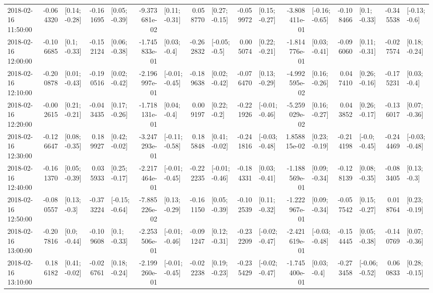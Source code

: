 \begin{tabular}{lrlrlrlrlrlrlrlrl}
2018-02-16 11:50:00 & -0.064320 &   [0.14; -0.28] & -0.161695 &   [0.05; -0.39] & -9.373681e-02 &   [0.11; -0.31] &  0.058770 &   [0.27; -0.15] & -0.059972 &   [0.15; -0.27] & -3.808411e-01 &  [-0.16; -0.65] & -0.108466 &    [0.1; -0.33] & -0.345538 &   [-0.13; -0.6] \\
2018-02-16 12:00:00 & -0.106685 &    [0.1; -0.33] & -0.152124 &   [0.06; -0.38] & -1.745833e-01 &    [0.03; -0.4] & -0.262832 &   [-0.05; -0.5] &  0.005074 &   [0.22; -0.21] & -1.814776e-01 &   [0.03; -0.41] & -0.096060 &   [0.11; -0.31] & -0.027574 &   [0.18; -0.24] \\
2018-02-16 12:10:00 & -0.200878 &   [0.01; -0.43] & -0.190516 &   [0.02; -0.42] & -2.196997e-01 &  [-0.01; -0.45] & -0.189638 &   [0.02; -0.42] & -0.076470 &   [0.13; -0.29] & -4.992595e-02 &   [0.16; -0.26] &  0.047410 &   [0.26; -0.16] & -0.175231 &    [0.03; -0.4] \\
2018-02-16 12:20:00 & -0.002615 &   [0.21; -0.21] & -0.043435 &   [0.17; -0.26] & -1.718131e-01 &    [0.04; -0.4] &  0.009197 &    [0.22; -0.2] & -0.221926 &  [-0.01; -0.46] & -5.259029e-02 &   [0.16; -0.27] &  0.043852 &   [0.26; -0.17] & -0.136017 &   [0.07; -0.36] \\
2018-02-16 12:30:00 & -0.126647 &   [0.08; -0.35] &  0.189927 &   [0.42; -0.02] & -3.247293e-01 &  [-0.11; -0.58] &  0.185848 &   [0.41; -0.02] & -0.241816 &  [-0.03; -0.48] &  1.858815e-02 &   [0.23; -0.19] & -0.214198 &   [-0.0; -0.45] & -0.244469 &  [-0.03; -0.48] \\
2018-02-16 12:40:00 & -0.161370 &   [0.05; -0.39] &  0.035933 &   [0.25; -0.17] & -2.217464e-01 &  [-0.01; -0.45] & -0.222235 &  [-0.01; -0.46] & -0.184331 &   [0.03; -0.41] & -1.188569e-01 &   [0.09; -0.34] & -0.128139 &   [0.08; -0.35] & -0.083405 &    [0.13; -0.3] \\
2018-02-16 12:50:00 & -0.080557 &    [0.13; -0.3] & -0.373224 &  [-0.15; -0.64] & -7.885226e-02 &   [0.13; -0.29] & -0.161150 &   [0.05; -0.39] & -0.102539 &   [0.11; -0.32] & -1.222967e-01 &   [0.09; -0.34] & -0.057542 &   [0.15; -0.27] &  0.018764 &   [0.23; -0.19] \\
2018-02-16 13:00:00 & -0.207816 &    [0.0; -0.44] & -0.109608 &    [0.1; -0.33] & -2.253506e-01 &  [-0.01; -0.46] & -0.091247 &   [0.12; -0.31] & -0.232209 &  [-0.02; -0.47] & -2.421619e-01 &  [-0.03; -0.48] & -0.154445 &   [0.05; -0.38] & -0.140769 &   [0.07; -0.36] \\
2018-02-16 13:10:00 &  0.186182 &   [0.41; -0.02] & -0.026761 &   [0.18; -0.24] & -2.199260e-01 &  [-0.01; -0.45] & -0.022238 &   [0.19; -0.23] & -0.235429 &  [-0.02; -0.47] & -1.745400e-01 &    [0.03; -0.4] & -0.273458 &  [-0.06; -0.52] &  0.060833 &   [0.28; -0.15] \\

\end{tabular}
